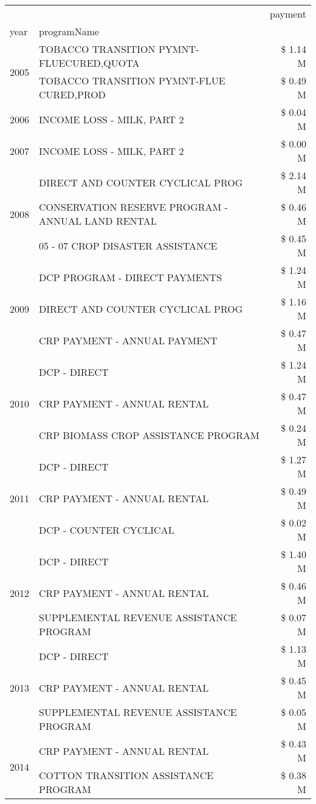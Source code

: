 \begin{tabular}{llr}
\toprule
 &  & payment \\
year & programName &  \\
\midrule
\multirow[t]{2}{*}{2005} & TOBACCO TRANSITION PYMNT-FLUECURED,QUOTA & \$ 1.14 M \\
 & TOBACCO TRANSITION PYMNT-FLUE CURED,PROD & \$ 0.49 M \\
\cline{1-3}
2006 & INCOME LOSS - MILK, PART 2 & \$ 0.04 M \\
\cline{1-3}
2007 & INCOME LOSS - MILK, PART 2 & \$ 0.00 M \\
\cline{1-3}
\multirow[t]{3}{*}{2008} & DIRECT AND COUNTER CYCLICAL PROG & \$ 2.14 M \\
 & CONSERVATION RESERVE PROGRAM - ANNUAL LAND RENTAL & \$ 0.46 M \\
 & 05 - 07 CROP DISASTER ASSISTANCE & \$ 0.45 M \\
\cline{1-3}
\multirow[t]{3}{*}{2009} & DCP PROGRAM - DIRECT PAYMENTS & \$ 1.24 M \\
 & DIRECT AND COUNTER CYCLICAL PROG & \$ 1.16 M \\
 & CRP PAYMENT - ANNUAL PAYMENT & \$ 0.47 M \\
\cline{1-3}
\multirow[t]{3}{*}{2010} & DCP - DIRECT & \$ 1.24 M \\
 & CRP PAYMENT - ANNUAL RENTAL & \$ 0.47 M \\
 & CRP BIOMASS CROP ASSISTANCE PROGRAM & \$ 0.24 M \\
\cline{1-3}
\multirow[t]{3}{*}{2011} & DCP - DIRECT & \$ 1.27 M \\
 & CRP PAYMENT - ANNUAL RENTAL & \$ 0.49 M \\
 & DCP - COUNTER CYCLICAL & \$ 0.02 M \\
\cline{1-3}
\multirow[t]{3}{*}{2012} & DCP - DIRECT & \$ 1.40 M \\
 & CRP PAYMENT - ANNUAL RENTAL & \$ 0.46 M \\
 & SUPPLEMENTAL REVENUE ASSISTANCE PROGRAM & \$ 0.07 M \\
\cline{1-3}
\multirow[t]{3}{*}{2013} & DCP - DIRECT & \$ 1.13 M \\
 & CRP PAYMENT - ANNUAL RENTAL & \$ 0.45 M \\
 & SUPPLEMENTAL REVENUE ASSISTANCE PROGRAM & \$ 0.05 M \\
\cline{1-3}
\multirow[t]{3}{*}{2014} & CRP PAYMENT - ANNUAL RENTAL & \$ 0.43 M \\
 & COTTON TRANSITION ASSISTANCE PROGRAM & \$ 0.38 M \\

\end{tabular}
